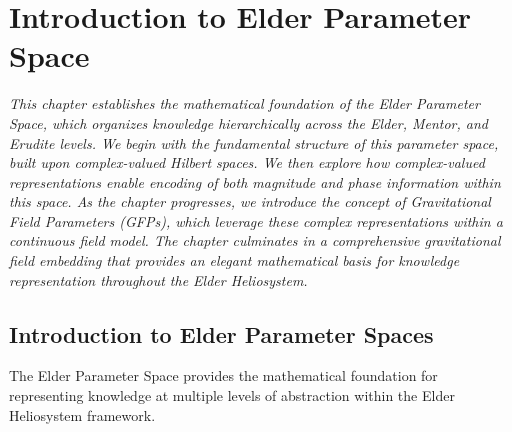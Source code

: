 \chapter{Introduction to Elder Parameter Space}

\textit{This chapter establishes the mathematical foundation of the Elder Parameter Space, which organizes knowledge hierarchically across the Elder, Mentor, and Erudite levels. We begin with the fundamental structure of this parameter space, built upon complex-valued Hilbert spaces. We then explore how complex-valued representations enable encoding of both magnitude and phase information within this space. As the chapter progresses, we introduce the concept of Gravitational Field Parameters (GFPs), which leverage these complex representations within a continuous field model. The chapter culminates in a comprehensive gravitational field embedding that provides an elegant mathematical basis for knowledge representation throughout the Elder Heliosystem.}

\section{Introduction to Elder Parameter Spaces}

The Elder Parameter Space provides the mathematical foundation for representing knowledge at multiple levels of abstraction within the Elder Heliosystem framework.

